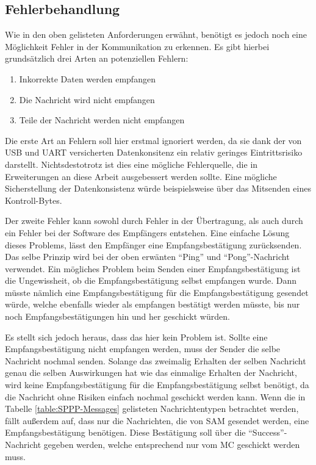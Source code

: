 \subsection{Fehlerbehandlung} \label{SPPP-Error-Handling}

Wie in den oben gelisteten Anforderungen erwähnt, benötigt es jedoch noch eine Möglichkeit Fehler in der Kommunikation zu erkennen.
Es gibt hierbei grundsätzlich drei Arten an potenziellen Fehlern:

\begin{enumerate}
    \item Inkorrekte Daten werden empfangen
    \item Die Nachricht wird nicht empfangen
    \item Teile der Nachricht werden nicht empfangen
\end{enumerate}

Die erste Art an Fehlern soll hier erstmal ignoriert werden, da sie dank der von USB und \ac{UART} versicherten Datenkonsitenz ein relativ geringes Eintrittsrisiko darstellt.
Nichtsdestotrotz ist dies eine mögliche Fehlerquelle, die in Erweiterungen an diese Arbeit ausgebessert werden sollte. %
Eine mögliche Sicherstellung der Datenkonsistenz würde beispielsweise über das Mitsenden eines Kontroll-Bytes.

Der zweite Fehler kann sowohl durch Fehler in der Übertragung, als auch durch ein Fehler bei der Software des Empfängers entstehen.
Eine einfache Lösung dieses Problems, lässt den Empfänger eine Empfangsbestätigung zurücksenden.
Das selbe Prinzip wird bei der oben erwänten \enquote{Ping} und \enquote{Pong}-Nachricht verwendet.
Ein mögliches Problem beim Senden einer Empfangsbestätigung ist die Ungewissheit, ob die Empfangsbestätigung selbst empfangen wurde.
Dann müsste nämlich eine Empfangsbestätigung für die Empfangsbestätigung gesendet würde, welche ebenfalls wieder als empfangen bestätigt werden müsste, bis nur noch Empfangsbestätigungen hin und her geschickt würden.

Es stellt sich jedoch heraus, dass das hier kein Problem ist.
Sollte eine Empfangsbestätigung nicht empfangen werden, muss der Sender die selbe Nachricht nochmal senden.
Solange das zweimalig Erhalten der selben Nachricht genau die selben Auswirkungen hat wie das einmalige Erhalten der Nachricht, wird keine Empfangsbestätigung für die Empfangsbestätigung selbst benötigt, da die Nachricht ohne Risiken einfach nochmal geschickt werden kann.
Wenn die in Tabelle \ref{table:SPPP-Messages} gelisteten Nachrichtentypen betrachtet werden, fällt außerdem auf, dass nur die Nachrichten, die von \ac{SAM} gesendet werden, eine Empfangsbestätigung benötigen.
Diese Bestätigung soll über die \enquote{Success}-Nachricht gegeben werden, welche entsprechend nur vom \ac{MC} geschickt werden muss.

